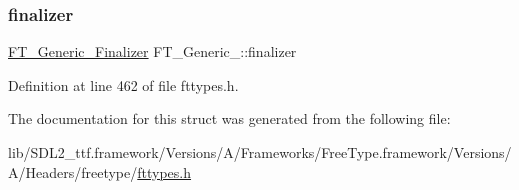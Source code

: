 \subsubsection{\texorpdfstring{finalizer}{finalizer}}
{\footnotesize\ttfamily \mbox{\hyperlink{fttypes_8h_a9f7f3174a89e80b1d9eff58620121b3f}{F\+T\+\_\+\+Generic\+\_\+\+Finalizer}} F\+T\+\_\+\+Generic\+\_\+\+::finalizer}



Definition at line 462 of file fttypes.\+h.



The documentation for this struct was generated from the following file\+:\begin{DoxyCompactItemize}
\item 
lib/\+S\+D\+L2\+\_\+ttf.\+framework/\+Versions/\+A/\+Frameworks/\+Free\+Type.\+framework/\+Versions/\+A/\+Headers/freetype/\mbox{\hyperlink{fttypes_8h}{fttypes.\+h}}\end{DoxyCompactItemize}

